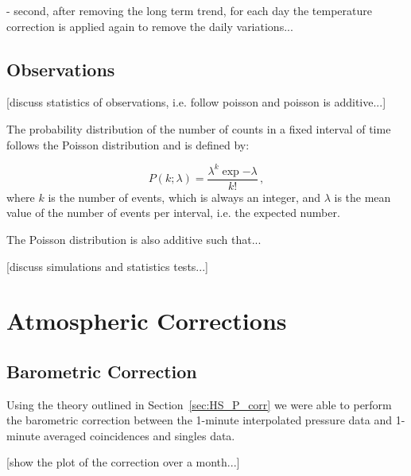 - second, after removing the long term trend, for each day the temperature correction is applied again to remove the daily variations...



\subsection{Observations}

[discuss statistics of observations, i.e. follow poisson and poisson is additive...]

The probability distribution of the number of counts in a fixed interval of time follows the Poisson distribution and is defined by:

\begin{equation}
P(k; \lambda) = \frac{\lambda^k \exp{-\lambda}}{k!} \, ,
\end{equation}
%
where $k$ is the number of events, which is always an integer, and $\lambda$ is the mean value of the number of events per interval, i.e. the expected number.

The Poisson distribution is also additive such that...



[discuss simulations and statistics tests...]


\section{Atmospheric Corrections}\label{sec:HS_14008_atmospheric_correction}

\subsection{Barometric Correction}\label{sec:HS_14008_P_corr}


Using the theory outlined in Section~\ref{sec:HS_P_corr} we were able to perform the barometric correction between the 1-minute interpolated pressure data and 1-minute averaged coincidences and singles data.

[show the plot of the correction over a month...]


